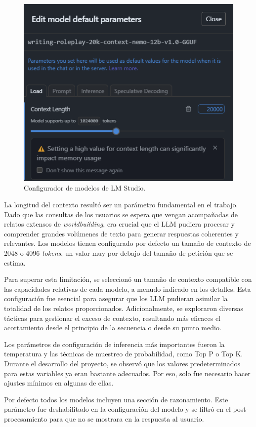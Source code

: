 \begin{figure}[htbp]
	\centering
	\includegraphics[width=0.8 \textwidth]{./Figures/config_menu.png}
	\caption{Configurador de modelos de LM Studio.}
	\label{fig:configMenu}
\end{figure}

La longitud del contexto resultó ser un parámetro fundamental en el trabajo.
Dado que las consultas de los usuarios se espera que vengan acompañadas de relatos extensos de \textit{worldbuilding},
era crucial que el LLM pudiera procesar y comprender grandes volúmenes de texto para generar respuestas coherentes y relevantes.
Los modelos tienen configurado por defecto un tamaño de contexto de 2048 o 4096 \textit{tokens},
un valor muy por debajo del tamaño de petición que se estima.

Para superar esta limitación, se seleccionó un tamaño de contexto compatible con las capacidades relativas de cada modelo,
a menudo indicado en los detalles.
Esta configuración fue esencial para asegurar que los LLM pudieran asimilar la totalidad de los relatos proporcionados.
Adicionalmente, se exploraron diversas tácticas para gestionar el exceso de contexto,
resultando más eficaces el acortamiento desde el principio de la secuencia o desde su punto medio.

Los parámetros de configuración de inferencia más importantes fueron la temperatura y
las técnicas de muestreo de probabilidad, como Top P o Top K.
Durante el desarrollo del proyecto, se observó que los valores predeterminados para estas variables
ya eran bastante adecuados. Por eso, solo fue necesario hacer ajustes mínimos en algunas de ellas.

Por defecto todos los modelos incluyen una sección de razonamiento.
Este parámetro fue deshabilitado en la configuración del modelo
y se filtró en el post-procesamiento para que no se mostrara en la respuesta al usuario.

